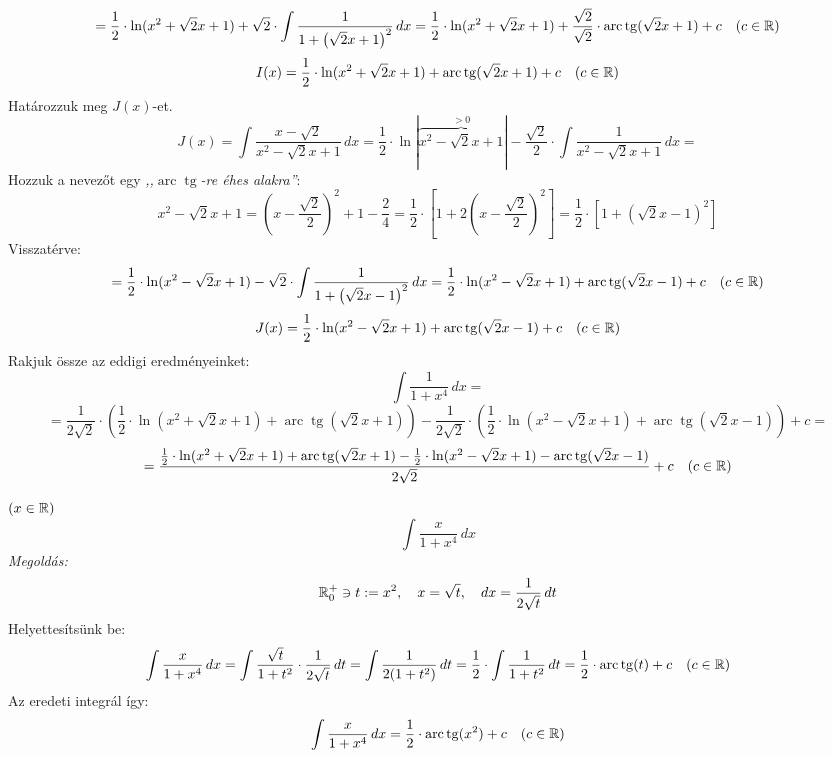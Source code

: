 \documentclass[a4paper,11.5pt]{article}
\DeclareMathOperator{\tg}{tg}
\DeclareMathOperator{\arc}{arc}
\begin{document}
\begin{exercise}
 		\[ =\frac{1}{2}\cdot\ln(x^2+\sqrt{2}x+1)+\sqrt{2}\cdot\int\frac{1}{1+\left(\sqrt{2}x+1\right)^2}\,dx=\frac{1}{2}\cdot\ln(x^2+\sqrt{2}x+1)+\frac{\sqrt{2}}{\sqrt{2}}\cdot\arc\tg(\sqrt{2}x+1)+c\quad (c\in\R) \]
 		\[ I(x)=\frac{1}{2}\cdot\ln(x^2+\sqrt{2}x+1)+\arc\tg(\sqrt{2}x+1)+c\quad (c\in\R) \]
 		Határozzuk meg $J(x)$-et.
 		\[ J(x)=\int\frac{x-\sqrt{2}}{x^2-\sqrt{2}x+1}\,dx=\frac{1}{2}\cdot\ln|\overbrace{x^2-\sqrt{2}x+1}^{>0}|-\frac{\sqrt{2}}{2}\cdot\int\frac{1}{x^2-\sqrt{2}x+1}\,dx=\]
 		Hozzuk a nevezőt egy \textit{,,$\arc\tg$-re éhes alakra''}:
 		\[ x^2-\sqrt{2}x+1=\left(x-\frac{\sqrt{2}}{2}\right)^2+1-\frac{2}{4}=\frac{1}{2}\cdot\left[1+2\left(x-\frac{\sqrt{2}}{2}\right)^2\right]=\frac{1}{2}\cdot\left[1+\left(\sqrt{2}x-1\right)^2\right] \]
 		Visszatérve:
 		\[=\frac{1}{2}\cdot\ln(x^2-\sqrt{2}x+1)-\sqrt{2}\cdot\int\frac{1}{1+\left(\sqrt{2}x-1\right)^2}\,dx=\frac{1}{2}\cdot\ln(x^2-\sqrt{2}x+1)+\arc\tg(\sqrt{2}x-1)+c\quad (c\in\R) \]
 		\[ J(x)=\frac{1}{2}\cdot\ln(x^2-\sqrt{2}x+1)+\arc\tg(\sqrt{2}x-1)+c\quad (c\in\R) \]
 		Rakjuk össze az eddigi eredményeinket:
 		\[ \int\frac{1}{1+x^4}\,dx =\]
 		\[=\frac{1}{2\sqrt{2}}\cdot\left(\frac{1}{2}\cdot\ln(x^2+\sqrt{2}x+1)+\arc\tg(\sqrt{2}x+1)\right)-\frac{1}{2\sqrt{2}}\cdot\left(\frac{1}{2}\cdot\ln(x^2-\sqrt{2}x+1)+\arc\tg(\sqrt{2}x-1)\right)+c= \]
 		\[=\frac{\frac{1}{2}\cdot\ln(x^2+\sqrt{2}x+1)+\arc\tg(\sqrt{2}x+1)-\frac{1}{2}\cdot\ln(x^2-\sqrt{2}x+1)-\arc\tg(\sqrt{2}x-1)}{2\sqrt{2}}+c\quad (c\in\R) \]
% 		
	\end{exercise}
	\begin{exercise}$(x\in\mathbb{R})$
		\[ \int\frac{x}{1+x^4}\,dx \]
		\textit{Megoldás:} 
		\[ \mathbb{R}_0^+\ni t:=x^2,\quad x=\sqrt{t},\quad dx=\frac{1}{2\sqrt{t}}\,dt \]
		Helyettesítsünk be:
		\[ \int\frac{x}{1+x^4}\,dx=\int\frac{\sqrt{t}}{1+t^2}\cdot\frac{1}{2\sqrt{t}}\,dt=\int\frac{1}{2(1+t^2)}\,dt=\frac{1}{2}\cdot\int\frac{1}{1+t^2}\,dt=\frac{1}{2}\cdot\arc\tg(t)+c\quad (c\in\R) \]
		Az eredeti integrál így:
		\[ \int\frac{x}{1+x^4}\,dx=\frac{1}{2}\cdot\arc\tg(x^2)+c\quad (c\in\R) \]
	\end{exercise}
\end{document}
